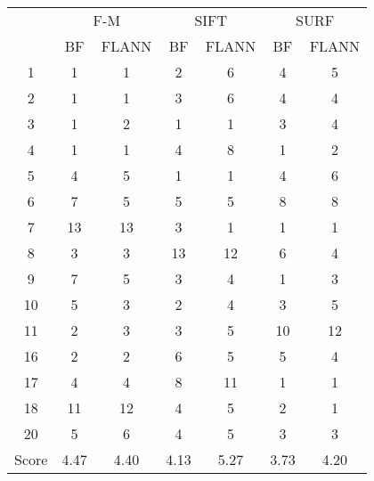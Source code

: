 \documentclass[draft,final]{vutinfth} %
\begin{document}
\begin{appendices}
\begin{minipage}{\linewidth}
\centering
\begin{tabular}{c|cc|cc|cc}
\multirow{2}{*}{ } & \multicolumn{2}{c}{ F-M } & \multicolumn{2}{c}{ SIFT } & \multicolumn{2}{c}{ SURF } \\
& BF & FLANN & BF & FLANN & BF & FLANN \\
\hline
1 & 1 & 1 & 2 & 6 & 4 & 5 \\
2 & 1 & 1 & 3 & 6 & 4 & 4 \\
3 & 1 & 2 & 1 & 1 & 3 & 4 \\
4 & 1 & 1 & 4 & 8 & 1 & 2 \\
5 & 4 & 5 & 1 & 1 & 4 & 6 \\
6 & 7 & 5 & 5 & 5 & 8 & 8 \\
7 & 13 & 13 & 3 & 1 & 1 & 1 \\
8 & 3 & 3 & 13 & 12 & 6 & 4 \\
9 & 7 & 5 & 3 & 4 & 1 & 3 \\
10 & 5 & 3 & 2 & 4 & 3 & 5 \\
11 & 2 & 3 & 3 & 5 & 10 & 12 \\
16 & 2 & 2 & 6 & 5 & 5 & 4 \\
17 & 4 & 4 & 8 & 11 & 1 & 1 \\
18 & 11 & 12 & 4 & 5 & 2 & 1 \\
20 & 5 & 6 & 4 & 5 & 3 & 3 \\
\hline
Score & 4.47 & 4.40 & 4.13 & 5.27 & 3.73 & 4.20 \\
\end{tabular}

 \label{tab:25Mean} 
\end{minipage}



\end{appendices}
\end{document}
